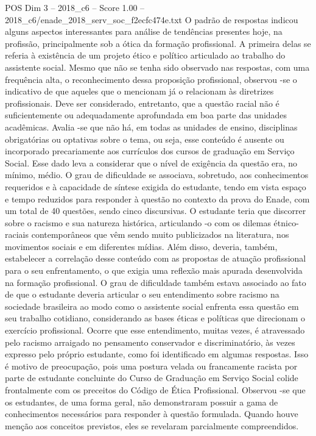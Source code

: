 \begin{textsample}{POS Dim 3 – 2018\_c6 – Score 1.00 – 2018\_c6/enade\_2018\_serv\_soc\_f2ecfc474e.txt}
O padrão de respostas indicou alguns aspectos interessantes para análise de tendências presentes hoje, na profissão, principalmente sob a ótica da formação profissional.
A primeira delas se referia à existência de um projeto ético e político articulado ao trabalho do assistente social.
Mesmo que não se tenha sido observado nas respostas, com uma frequência alta, o reconhecimento dessa proposição profissional, observou -se o indicativo de que aqueles que o mencionam já o relacionam às diretrizes profissionais.
Deve ser considerado, entretanto, que a questão racial não é suficientemente ou adequadamente aprofundada em boa parte das unidades acadêmicas.
Avalia -se que não há, em todas as unidades de ensino, disciplinas obrigatórias ou optativas sobre o tema, ou seja, esse conteúdo é ausente ou incorporado precariamente aos currículos dos cursos de graduação em Serviço Social.
Esse dado leva a considerar que o nível de exigência da questão era, no mínimo, médio.
O grau de dificuldade se associava, sobretudo, aos conhecimentos requeridos e à capacidade de síntese exigida do estudante, tendo em vista espaço e tempo reduzidos para responder à questão no contexto da prova do Enade, com um total de 40 questões, sendo cinco discursivas.
O estudante teria que discorrer sobre o racismo e sua natureza histórica, articulando -o com os dilemas étnico-raciais contemporâneos que vêm sendo muito publicizados na literatura, nos movimentos sociais e em diferentes mídias.
Além disso, deveria, também, estabelecer a correlação desse conteúdo com as propostas de atuação profissional para o seu enfrentamento, o que exigia uma reflexão mais apurada desenvolvida na formação profissional.
O grau de dificuldade também estava associado ao fato de que o estudante deveria articular o seu entendimento sobre racismo na sociedade brasileira ao modo como o assistente social enfrenta essa questão em seu trabalho cotidiano, considerando as bases éticas e políticas que direcionam o exercício profissional.
Ocorre que esse entendimento, muitas vezes, é atravessado pelo racismo arraigado no pensamento conservador e discriminatório, às vezes expresso pelo próprio estudante, como foi identificado em algumas respostas.
Isso é motivo de preocupação, pois uma postura velada ou francamente racista por parte de estudante concluinte do Curso de Graduação em Serviço Social colide frontalmente com os preceitos do Código de Ética Profissional.
Observou -se que os estudantes, de uma forma geral, não demonstraram possuir a gama de conhecimentos necessários para responder à questão formulada.
Quando houve menção aos conceitos previstos, eles se revelaram parcialmente compreendidos.

\end{textsample}
